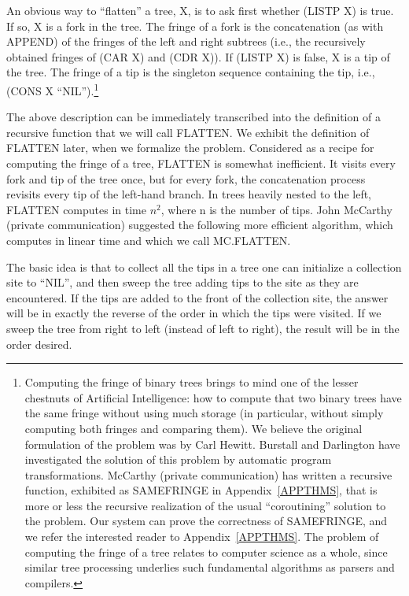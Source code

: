 \documentclass[11pt]{book}
\begin{document}
An obvious way to
``flatten'' a tree, X, is to ask first whether (LISTP X) is true.  If so, X is a fork in
the tree.  The fringe of a fork is the concatenation (as with APPEND) of
the fringes of the left and right subtrees (i.e., the recursively obtained
fringes of (CAR X) and (CDR X)).
If (LISTP X) is false, X is a tip of the tree.  The fringe of
a tip is the singleton sequence containing the tip, i.e., (CONS X ``NIL'').\footnote{Computing the fringe of binary trees brings to mind one of the lesser chestnuts of Artificial Intelligence: how to compute that two binary trees have the same fringe without using much storage (in particular, without simply computing both fringes and comparing them).  We believe the original formulation of the problem was by Carl Hewitt.  Burstall and Darlington \cite{BURSTALLTRANS} have investigated the solution  of this problem by automatic program transformations. McCarthy (private communication) has written a recursive function, exhibited as SAMEFRINGE in Appendix~\ref{APPTHMS}, that is more or less the recursive realization of the usual ``coroutining'' solution to the problem.  Our system can prove the correctness of SAMEFRINGE, and we refer the interested reader to Appendix~\ref{APPTHMS}.  The problem of computing the fringe of a tree relates to computer science as a whole, since similar tree processing underlies such fundamental algorithms as parsers and compilers.}

The above description can be immediately transcribed into
the definition of a recursive function that we will call FLATTEN.  We exhibit the
definition of FLATTEN later, when we formalize the problem.
Considered as a recipe for computing the fringe of a tree, FLATTEN
is somewhat inefficient.  It visits every fork and tip of the tree once, but
for every fork, the concatenation process revisits
every tip of the left-hand branch.  In trees heavily nested to the left,
FLATTEN computes in time $n^{2}$, where n is the number of tips.
John McCarthy (private communication)
suggested the following more efficient algorithm, which computes
in linear time and which we call MC.FLAT\-TEN.

The basic idea is that to collect all the tips in a
tree one can initialize a collection site to ``NIL'', and then
sweep the tree adding tips to the site as they are encountered.
If the tips are added to the front of the collection site, the answer will be in
exactly the reverse of the order in which the tips were visited.
If we sweep the tree from right to left (instead of left to right), the result will be
in the order desired.
\end{document}
